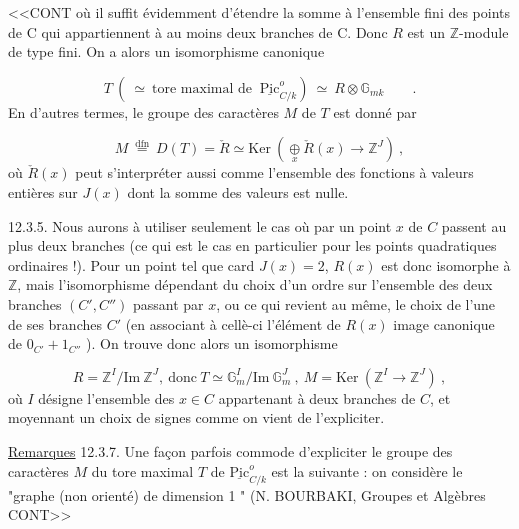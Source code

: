 
<<CONT où il suffit évidemment d'étendre la somme à l'ensemble fini des points de C qui appartiennent à au moins deux branches de C. Donc $R$ est un $\mathbb{Z}$-module de type fini. On a alors un isomorphisme canonique

\begin{equation}\tag{12.2.3}
T\ (\ \simeq\ \mbox{tore maximal de }\ \underline{\mathrm{Pic}}^{o}_{C/k})\ \simeq\ R \otimes \mathbb{G}_{mk}\qquad .
\end{equation}
En d'autres termes, le groupe des caractères $M$ de $T$ est donné par

\begin{equation}\tag{12.2.4}
M\ \stackrel{\mathrm{dfn}}{=}\ D(T) = \check{R} \simeq \mathrm{Ker}\ (\mathop{\oplus}\limits_{x} \check{R}(x) \longrightarrow \mathbb{Z}^{J})\ ,
\end{equation}
où $\check{R}(x)$ peut s'interpréter aussi comme l'ensemble des fonctions à valeurs entières sur $J(x)$ dont la somme des valeurs est nulle.

12.3.5. Nous aurons à utiliser seulement le cas où par un point $x$ de $C$ passent au plus deux branches (ce qui est le cas en particulier pour les points quadratiques ordinaires !). Pour un point tel que card $J(x) = 2$, $R(x)$ est donc isomorphe à $\mathbb{Z}$, mais l'isomorphisme dépendant du choix d'un ordre sur l'ensemble des deux branches $(C',C'')$ passant par $x$, ou ce qui revient au même, le choix de l'une de ses branches $C'$ (en associant à cellè-ci l'élément de $R(x)$ image canonique de $0_{C'} + 1_{C''}$ ). On trouve donc alors un isomorphisme

\begin{equation}\tag{12.3.6}
R = \mathbb{Z}^{I}/\mathrm{Im}\ \mathbb{Z}^{J},\ \mbox{donc}\ T \simeq \mathbb{G}_{m}^{I}/\mathrm{Im}\ \mathbb{G}_{m}^{J}\ ,\ M = \mathrm{Ker}\ (\mathbb{Z}^{I} \longrightarrow \mathbb{Z}^{J})\ ,
\end{equation}
où $I$ désigne l'ensemble des $x \in C$ appartenant à deux branches de $C$, et moyennant un choix de signes comme on vient de l'expliciter.

\underline{Remarques} 12.3.7. Une façon parfois commode d'expliciter le groupe des caractères $M$ du tore maximal $T$ de $\underline{\mathrm{Pic}}^{o}_{C/k}$ est la suivante : on considère le "graphe (non orienté) de dimension 1 " (N. BOURBAKI, Groupes et Algèbres CONT>>



